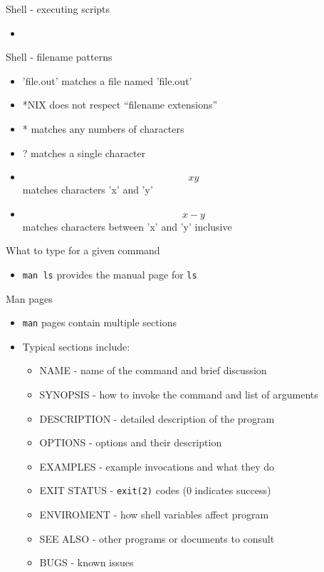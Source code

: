 \documentclass[t]{beamer}
\begin{document}
\begin{frame}{Shell - executing scripts}
  \begin{itemize}
  \item 
  \end{itemize}
  \note{
}
\end{frame}

\begin{frame}{Shell - filename patterns }
  \begin{itemize}
  \item 'file.out' matches a file named 'file.out'
  \item *NIX does not respect ``filename extensions''
  \item * matches any numbers of characters
  \item ? matches a single character
  \item \[xy\] matches characters 'x' and 'y'
  \item \[x-y\] matches characters between 'x' and 'y' inclusive
  \end{itemize}
  \note{}
\end{frame}



\begin{frame}{What to type for a given command}

  \begin{itemize}
  \item \texttt{man ls} provides the manual page for \texttt{ls}
  \end{itemize}
  \note{}
\end{frame}

\begin{frame}{Man pages}
  \begin{itemize}
  \item \texttt{man} pages contain multiple sections
  \item Typical sections include:
    \begin{itemize}
    \item NAME - name of the command and brief discussion
    \item SYNOPSIS - how to invoke the command and list of arguments
    \item DESCRIPTION - detailed description of the program
    \item OPTIONS - options and their description
    \item EXAMPLES - example invocations and what they do
    \item EXIT STATUS - \texttt{exit(2)} codes (0 indicates success) 
    \item ENVIROMENT - how shell variables affect program
    \item SEE ALSO - other programs or documents to consult
    \item BUGS - known issues
    \end{itemize}
  \end{itemize}
  \note{}
\end{frame}
\end{document}
